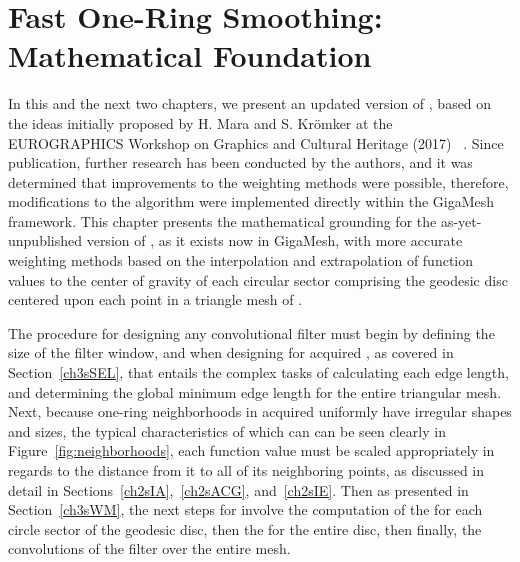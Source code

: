 \chapter{Fast One-Ring Smoothing: Mathematical Foundation}
\label{ch3}
In this and the next two chapters, we present an updated version of , based on the ideas initially proposed by H. Mara and S. Krömker at the EUROGRAPHICS Workshop on Graphics and Cultural Heritage (2017) ~\cite[s.~3.2]{Mara17}. Since publication, further research has been conducted by the authors, and it was determined that improvements to the weighting methods were possible, therefore, modifications to the algorithm were implemented directly within the GigaMesh  framework. This chapter presents the mathematical grounding for the as-yet-unpublished version of , as it exists now in GigaMesh, with more accurate weighting methods based on the interpolation and extrapolation of function values to the center of gravity of each circular sector comprising the geodesic disc centered upon each point in a triangle mesh of \tdd{}.

The procedure for designing any convolutional filter must begin by defining the size of the filter window, and when designing for acquired \tdd{}, as covered in Section~\ref{ch3sSEL}, that entails the complex tasks of calculating each edge length, and determining the global minimum edge length for the entire triangular mesh. Next, because one-ring neighborhoods in acquired \tdd{} uniformly have irregular shapes and sizes, the typical characteristics of which can can be seen clearly in Figure~\ref{fig:neighborhoods}, each function value must be scaled appropriately in regards to the distance from it to all of its neighboring points, as discussed in detail in Sections~\ref{ch2sIA},~\ref{ch2sACG}, and~\ref{ch2sIE}. Then as presented in Section~\ref{ch3sWM}, the next steps for  involve the computation of the  for each circle sector of the geodesic disc, then the \wmfv{} for the entire disc, then finally, the convolutions of the filter over the entire mesh.



%
%
%
%
